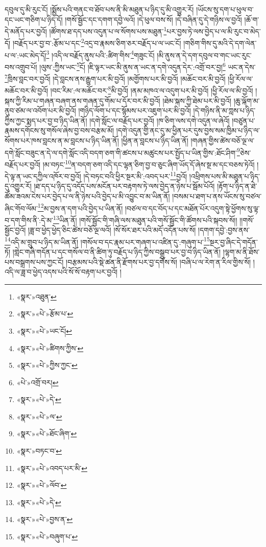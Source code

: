 དབུལ་དུ་མི་རུང་ངོ། །སྨྱོས་པའི་གནང་བ་ཐོབ་པས་ནི་མི་མཐུན་པ་ཉིད་དུ་མི་འགྱུར་རོ། །ཡོངས་སུ་དག་པ་ཕུལ་བ་དང་ཡང་གཅིག་པ་ཉིད་དོ། །གསོ་སྦྱོང་དང་དགག་དབྱེ་ལའོ། །དེ་ཕུལ་བས་སོ། །དེ་བཞིན་དུ་དེ་གཉིས་ལ་བྱའོ། །ཆོ་ག་དེ་མནོད་པར་བྱའོ། །ཚོགས་ཐ་དད་པས་འདུན་པ་ལ་སོགས་པས་མཐུན་\footnote{«སྣར་»འཐུན་}པར་བྱས་ཏེ་ལས་བྱེད་པ་ལ་མི་རུང་བ་མེད་དོ། །བརྗོད་པར་བྱ་བ་:རྩོམ་པ་དང་\footnote{«སྣར་»«པེ་»རྩོམ་པ་}འདྲ་བ་རྣམས་ཅིག་ཅར་བརྗོད་པ་ལ་ཡང་ངོ། །གཅིག་གིས་དུ་མའི་དེ་དག་ལེན་པ་ལ་:ཡང་མེད་དོ།\footnote{«སྣར་»«པེ་»ཡང་ངོ།} །འདི་ལ་བརྗོད་ནུས་པའི་:ཚིག་གིས་\footnote{«སྣར་»«པེ་»ཚིགས་ཀྱིས་}གཟུང་ངོ། །མི་ནུས་ན་དེ་དག་དབུལ་བ་གང་ཡང་རུང་བས་འགྲུབ་པོ། །ལུས་:ཀྱིས་ཡང་\footnote{«སྣར་»«པེ་»ཀྱིས་ཀྱང་}ངོ། །ཇི་ལྟར་ཡང་མི་ནུས་ན་ཡང་ན་དགེ་འདུན་དེར་:འགྲོ་བར་བྱ།\footnote{«པེ་»འགྲོ་བར།} ཡང་ན་དེས་\footnote{«སྣར་»«པེ་»དེ་}ཁྲིས་བླང་བར་བྱའོ། །དེ་བླངས་ནས་རྒྱུག་པར་མི་བྱའོ། །མགྱོགས་པར་མི་བྱའོ། །མཆོང་བར་མི་བྱའོ། །ཕྱི་རོལ་ལ་མཆོང་བར་མི་བྱའོ། །བང་རིམ་:ལ་མཆོང་བར་\footnote{«སྣར་»«པེ་»ལ་}མི་བྱའོ། །ནམ་མཁའ་ལ་འདུག་པར་མི་བྱའོ། །ཕྱི་རོལ་ལ་མི་བྱའོ། །སྐས་ཀྱི་རིམ་པ་གཞན་བཞག་ནས་གཞན་དུ་གོམ་པ་དོར་བར་མི་བྱའོ། །ཐེམ་སྐས་ཀྱི་ཐེམ་པར་མི་བྱའོ། །ཆུ་ལྐོག་མ་ནུབ་ཙམ་ལ་འབོག་པར་མི་བྱའོ། །གཉིད་ལོག་པ་དང་སྙོམས་པར་འཇུག་པར་མི་བྱའོ། །དེ་གཉིས་ནི་མ་ཀླས་པ་ཉིད་ཀྱིས་ཀྱང་སྨད་པར་བྱ་བ་ཉིད་ཡིན་ནོ། །དགེ་སློང་ལ་བརྗོད་པར་བྱའོ། །ཁ་ཅིག་ལས་དགེ་འདུན་ལ་ཞེའོ། །བཙུན་པ་རྣམས་དགོངས་སུ་གསོལ་ཞེས་བྱ་བས་བརྩམ་མོ། །དགེ་འདུན་གྱི་ནང་དུ་མ་ཕྱིན་པར་དུས་བྱས་སམ་ཁྱིམ་པ་ཉིད་ལ་སོགས་པར་ཁས་བླངས་ན་མ་བླངས་པ་ཉིད་ཡིན་ནོ། །ཕྱིན་ན་བླངས་པ་ཉིད་ཡིན་ནོ། །གཞན་གྱིས་ཚེས་བཅོ་ལྔ་ལ་དགེ་སློང་བཟུང་ན་དེ་ལ་དགེ་སློང་འདི་བདག་ཅག་གི་ཚངས་པ་མཚུངས་པར་སྤྱོད་པ་ཡིན་གྱིས་:ཐོང་ཤིག་\footnote{«སྣར་»«པེ་»ཐོང་ཞིག་}ཅེས་བརྗོད་པར་བྱའོ། །མ་བཏང་\footnote{«སྣར་»བཏང་བ་}ན་བདག་ཅག་འདི་དང་ལྷན་ཅིག་བྱ་བ་ཅུང་ཞིག་ཡོད་དོ་ཞེས་སྔ་མ་དང་བཅས་ཏེའོ། །དེ་ལྟ་ན་ཡང་དཀྱིལ་འཁོར་བ་བྱའོ། །དེ་བཏང་བའི་ཕྱིར་སྔར་མི་:འབད་པར་\footnote{«སྣར་»«པེ་»འབད་པར་མི་}བྱའོ། །འཕྲིགས་པས་མི་མཐུན་པ་ཉིད་དུ་འགྱུར་རོ། །ཐ་དད་པ་ཉིད་དུ་འདོད་པས་མངོན་པར་བརྟགས་ཏེ་ལས་བྱེད་ན་ཉེས་པ་སྦོམ་པོའོ། །རྟོག་པ་ཉིད་ན་ཐེ་ཚོམ་ཟའམ་ངེས་པར་བྱེད་པ་ལ་ནི་ཉེས་པའི་བྱེད་པ་མི་འབྱུང་བ་མ་ཡིན་ནོ། །བསམ་པ་ཐག་པ་ནས་ཡོངས་སུ་བཙལ་ཞིང་གོབ་ལོམ་\footnote{«སྣར་»«པེ་»ལོབ་}མ་བྱས་ན་དག་པའི་བྱེད་པ་ཡིན་ནོ། །བཙལ་བ་དང་བོད་པ་དང་མཐོན་པོར་འདུག་སྟེ་ཕྱོགས་སུ་ལྟ་བ་དག་གིས་ནི་:དེ་མ་\footnote{«སྣར་»«པེ་»དེ་}ཡིན་ནོ། །གསོ་སྦྱོང་གི་གཞི་ལས་མཐུན་པའི་གསོ་སྦྱོང་གི་ཚོགས་པའི་སྐབས་སོ།། །།གསོ་སྦྱོང་བྱའོ། །ཟླ་བ་ཕྱེད་ཕྱེད་ཅིང་ཚེས་བཅོ་ལྔ་ལའོ། །སོ་སོར་ཐར་པའི་མདོ་འདོན་པས་སོ། །དགག་དབྱེ་:བྱས་ནས་\footnote{«སྣར་»«པེ་»བྱས་ན་}འདི་མ་གྲུབ་པ་ཉིད་མ་ཡིན་ནོ། །གསོལ་བ་དང་རྣམ་པར་གཞག་པ་འཛིན་དུ་:གཞུག་པ་\footnote{«སྣར་»«པེ་»བཞུག་པ་}སྔར་བྱ་ཞིང་དེ་གདོན་ཏོ། །གླེང་གཞི་གདོན་པ་དང་གསོལ་བ་ནི་ཚིག་ཏུ་བརྗོད་པ་ཉིད་ཀྱིས་བསྒྲུབ་པར་བྱ་བ་ཉིད་ཡིན་ནོ། །ལྷག་མ་ནི་ཐོས་པས་བསྒྲགས་པས་ཀྱང་ངོ། །བརྩམས་པའི་སྡེ་ཚན་ནི་རྫོགས་པར་བྱ་དགོས་སོ། །བཞི་པ་ལ་རེག་ན་རིལ་གྱིས་སོ། །འདི་ལ་ཟླ་བ་ཕྱེད་འདས་པའི་སོ་སོ་བརྟག་པར་བྱའོ། །
